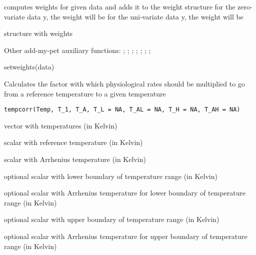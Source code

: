 \documentclass[a4paper]{book}
\begin{document}
%
\begin{Details}\relax
computes weights for given data and adds it to the weight structure
for the zero-variate data y, the weight will be
for the uni-variate data y, the weight will be
\end{Details}
%
\begin{Value}
structure with weights
\end{Value}
%
\begin{SeeAlso}\relax
Other add-my-pet auxiliary functions: ;
; ;
; ;
; ;
\end{SeeAlso}
%
\begin{Examples}
\begin{ExampleCode}
setweights(data)
\end{ExampleCode}
\end{Examples}
%
\begin{Description}\relax
Calculates the factor with which physiological rates should be multiplied to go from a reference temperature to a given temperature
\end{Description}
%
\begin{Usage}
\begin{verbatim}
tempcorr(Temp, T_1, T_A, T_L = NA, T_AL = NA, T_H = NA, T_AH = NA)
\end{verbatim}
\end{Usage}
%
\begin{Arguments}
\begin{ldescription}
\item[\code{Temp}] vector with temperatures (in Kelvin)

\item[\code{T\_1}] scalar with reference temperature (in Kelvin)

\item[\code{T\_A}] scalar with Arrhenius temperature (in Kelvin)

\item[\code{T\_L}] optional scalar with lower boundary of temperature range (in Kelvin)

\item[\code{T\_AL}] optional scalar with Arrhenius temperature for lower boundary of temperature range (in Kelvin)

\item[\code{T\_H}] optional scalar with upper boundary of temperature range (in Kelvin)

\item[\code{T\_AH}] optional scalar with Arrhenius temperature for upper boundary of temperature range (in Kelvin)
\end{ldescription}
\end{Arguments}
\end{document}
